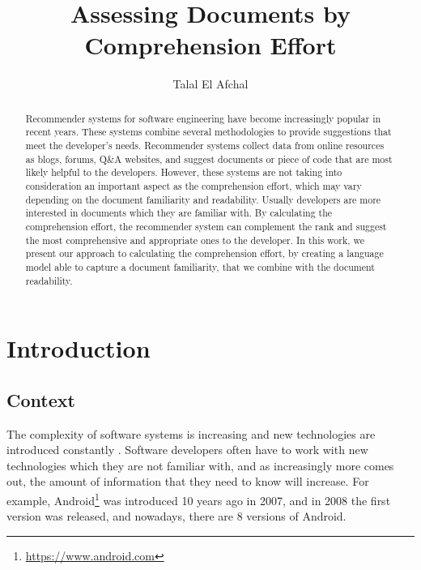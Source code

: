 \documentclass[12pt,mscthesis]{usiinfthesis}
\title{Assessing Documents by Comprehension Effort } %
\author{Talal El Afchal} %
\begin{document}
\maketitle %

\frontmatter %

\begin{abstract}
Recommender systems for software engineering have become increasingly popular in recent years. These systems combine several methodologies to provide suggestions that meet the developer's needs. Recommender systems collect data from online resources as blogs, forums, Q\&A websites, and suggest documents or piece of code that are most likely helpful to the developers. However, these systems are not taking into consideration an important aspect as the comprehension effort, which may vary depending on the document familiarity and readability. Usually developers are more interested in documents which they are familiar with. By calculating the comprehension effort, the recommender system can complement the rank and suggest the most comprehensive and appropriate ones to the developer. In this work, we present our approach to calculating the comprehension effort, by creating a language model able to capture a document familiarity, that we combine with the document readability. 
\end{abstract}

\begin{acknowledgements}
\end{acknowledgements}

\tableofcontents 
\listoffigures %
\listoftables %

\mainmatter

\chapter{Introduction}

	\section{Context}
	The complexity of software systems is increasing and new technologies are introduced constantly \cite{Lehman:1985:PEP:7261}. Software developers often have to work with new technologies which they are not familiar with, and as increasingly more comes out, the amount of information that they need to know will increase. For example, Android\footnote{\url{https://www.android.com}} was introduced 10 years ago in 2007, and in 2008 the first version was released, and nowadays, there are 8 versions of Android. 
	
\end{document}
